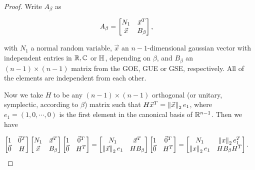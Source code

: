 \begin{proof}
    Write $A_{\beta}$ as 

    \begin{align*}
        A_{\beta} &= \begin{bmatrix}
            N_1 & \vec x^T \\ 
            \vec x & B_{\beta}
        \end{bmatrix},
    \end{align*}

    \noindent with $N_1$ a normal random variable, $\vec x$ an $n-1$-dimensional gaussian vector with independent entries in $\mathbb R, \mathbb C$ or $\mathbb H$, depending on $\beta$, and $B_{\beta}$ an $(n-1)\times(n-1)$ matrix from the GOE, GUE or GSE, respectively. All of the elements are independent from each other.

    Now we take $H$ to be any $(n-1)\times(n-1)$ orthogonal (or unitary, symplectic, according to $\beta$) matrix such that $H \vec x^T = \left\lVert\vec x\right\rVert_2 e_1$, where $e_1 = (1,0,\cdots,0)$ is the first element in the canonical basis of $\mathbb R^{n-1}$. Then we have

    \begin{align*}
        \begin{bmatrix}
            1 & \vec0^T \\ 
            \vec0 & H
        \end{bmatrix} 
        \begin{bmatrix}
            N_1 & \vec x^T \\ 
            \vec x & B_{\beta}
        \end{bmatrix}  
        \begin{bmatrix}
            1 & \vec 0^T \\ 
            \vec 0 & H^T
        \end{bmatrix} &= \begin{bmatrix}
            N_1 & \vec x^T \\ 
            \left\lVert\vec x\right\rVert_2e_1 & H B_{\beta}
        \end{bmatrix}  
        \begin{bmatrix}
            1 & \vec0^T \\ 
            \vec0 & H^T
        \end{bmatrix} 
        =
        \begin{bmatrix}
            N_1 & \left\lVert x\right\rVert_2e_1^T \\ 
            \left\lVert x\right\rVert_2 e_1 & H B_\beta H^T
        \end{bmatrix}.
    \end{align*}


\end{proof}
